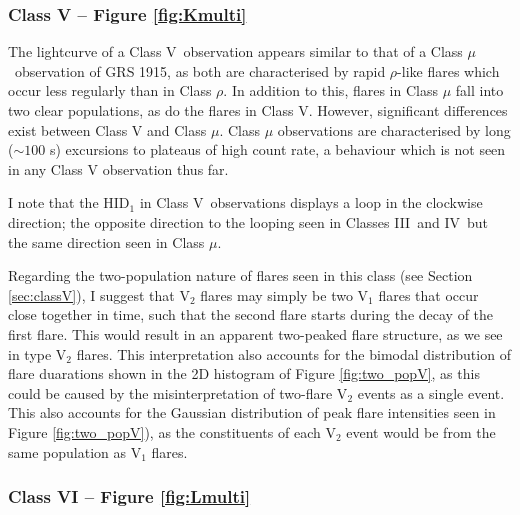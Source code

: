 \subsubsection{Class V -- Figure \ref{fig:Kmulti}}

\par The lightcurve of a Class V\indexv\ observation appears similar to that of a Class $\mu$\indexmu\ observation of GRS 1915, as both are characterised by rapid $\rho$\indexrho-like flares which occur less regularly than in Class $\rho$.  In addition to this, flares in Class $\mu$ fall into two clear populations, as do the flares in Class V.  However, significant differences exist between Class V and Class $\mu$.  Class $\mu$ observations are characterised by long ($\sim100$ s) excursions to plateaus of high count rate, a behaviour which is not seen in any Class V observation thus far.
\par I note that the HID$_1$ in Class V\indexv\ observations displays a loop in the clockwise direction; the opposite direction to the looping seen in Classes III\indexiii\ and IV\indexiv\ but the same direction seen in Class $\mu$\indexmu.
\par Regarding the two-population nature of flares seen in this class (see Section \ref{sec:classV}), I suggest that V$_2$ flares may simply be two V$_1$ flares that occur close together in time, such that the second flare starts during the decay of the first flare.  This would result in an apparent two-peaked flare structure, as we see in type V$_2$ flares.  This interpretation also accounts for the bimodal distribution of flare duarations shown in the 2D histogram of Figure \ref{fig:two_popV}, as this could be caused by the misinterpretation of two-flare V$_2$ events as a single event.  This also accounts for the Gaussian distribution of peak flare intensities seen in Figure \ref{fig:two_popV}), as the constituents of each V$_2$ event would be from the same population as V$_1$ flares.

\subsubsection{Class VI -- Figure \ref{fig:Lmulti}}

